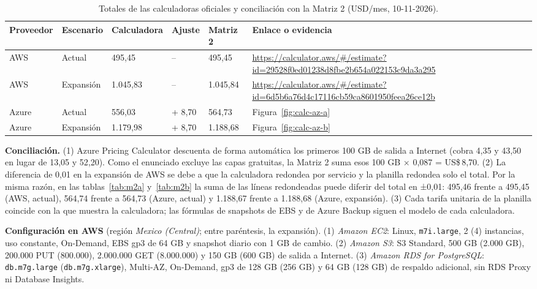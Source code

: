 \documentclass[11pt,letterpaper]{article}
\newcommand{\usd}[1]{US\$\,#1}
\begin{document}
\begin{table}[H]
\centering\footnotesize
\caption{Totales de las calculadoras oficiales y conciliación con la Matriz 2 (USD/mes, 10-11-2026).}\label{tab:calc}
\begin{tabularx}{\linewidth}{L{1.5cm}L{1.6cm}R{1.8cm}R{1.2cm}R{1.6cm}Y}
\toprule
\textbf{Proveedor} & \textbf{Escenario} & \textbf{Calculadora} & \textbf{Ajuste} & \textbf{Matriz 2} & \textbf{Enlace o evidencia}\\
\midrule
AWS & Actual & 495,45 & -- & 495,45 & \url{https://calculator.aws/\#/estimate?id=29528f0ed01238d8fbe2b654a022153c9da3a295}\\
 AWS & Expansión & 1.045,83 & -- & 1.045,84 & \url{https://calculator.aws/\#/estimate?id=6d5b6a76d4c17116cb59ca8601950feea26ce12b}\\
Azure & Actual & 556,03 & + 8,70 & 564,73 & Figura~\ref{fig:calc-az-a}\\
 Azure & Expansión & 1.179,98 & + 8,70 & 1.188,68 & Figura~\ref{fig:calc-az-b}\\
\bottomrule
\end{tabularx}
\end{table}

\textbf{Conciliación.} (1) Azure Pricing Calculator descuenta de forma automática los primeros 100 GB de salida a Internet (cobra 4,35 y 43,50 en lugar de 13,05 y 52,20). Como el enunciado excluye las capas gratuitas, la Matriz 2 suma esos 100 GB × 0,087 = \usd{8,70}. (2) La diferencia de 0,01 en la expansión de AWS se debe a que la calculadora redondea por servicio y la planilla redondea solo el total. Por la misma razón, en las tablas~\ref{tab:m2a} y~\ref{tab:m2b} la suma de las líneas redondeadas puede diferir del total en ±0,01: 495,46 frente a 495,45 (AWS, actual), 564,74 frente a 564,73 (Azure, actual) y 1.188,67 frente a 1.188,68 (Azure, expansión). (3) Cada tarifa unitaria de la planilla coincide con la que muestra la calculadora; las fórmulas de snapshots de EBS y de Azure Backup siguen el modelo de cada calculadora.

\textbf{Configuración en AWS} (región \emph{Mexico (Central)}; entre paréntesis, la expansión). (1) \emph{Amazon EC2}: Linux, \texttt{m7i.large}, 2 (4) instancias, uso constante, On-Demand, EBS gp3 de 64 GB y snapshot diario con 1 GB de cambio. (2) \emph{Amazon S3}: S3 Standard, 500 GB (2.000 GB), 200.000 PUT (800.000), 2.000.000 GET (8.000.000) y 150 GB (600 GB) de salida a Internet. (3) \emph{Amazon RDS for PostgreSQL}: \texttt{db.m7g.large} (\texttt{db.m7g.xlarge}), Multi-AZ, On-Demand, gp3 de 128 GB (256 GB) y 64 GB (128 GB) de respaldo adicional, sin RDS Proxy ni Database Insights.
\end{document}
